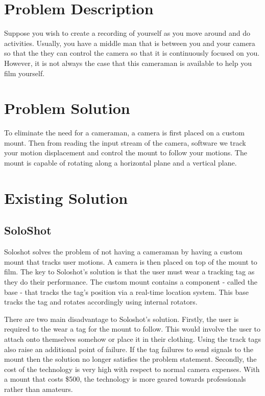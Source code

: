 \documentclass[12pt]{article}
\begin{document}
\maketitle

\section{Problem Description}
Suppose you wish to create a recording of yourself as you move around and do activities. Usually, you have a middle man that is between you and your camera so that the they can control the camera so that it is continuously focused on you. However, it is not always the case that this cameraman is available to help you film yourself.

\section{Problem Solution}
To eliminate the need for a cameraman, a camera is first placed on a custom mount. Then from reading the input stream of the camera, software we track your motion displacement and control the mount to follow your motions. The mount is capable of rotating along a horizontal plane and a vertical plane.

\section{Existing Solution}
\subsection{SoloShot}
Soloshot solves the problem of not having a cameraman by having a custom mount that tracks user motions. A camera is then placed on top of the mount to film. The key to Soloshot’s solution is that the user must wear a tracking tag as they do their performance. The custom mount contains a component - called the base - that tracks the tag’s position via a real-time location system. This base tracks the tag and rotates accordingly using internal rotators.
\par
There are two main disadvantage to Soloshot’s solution. Firstly, the user is required to the wear a tag for the mount to follow. This would involve the user to attach onto themselves somehow or place it in their clothing. Using the track tags also raise an additional point of failure. If the tag failures to send signals to the mount then the solution no longer satisfies the problem statement. Secondly, the cost of the technology is very high with respect to normal camera expenses. With a mount that costs \$500, the technology is more geared towards professionals rather than amateurs. 
\end{document}
